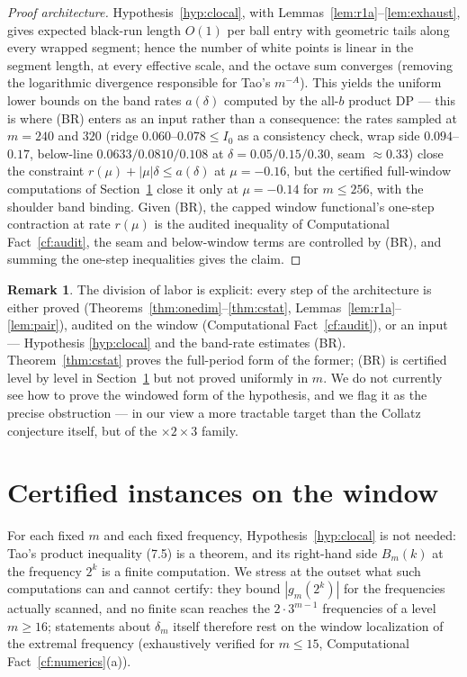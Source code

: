 \documentclass[11pt]{article}
\theoremstyle{definition}
\newtheorem{remark}[theorem]{Remark}
\begin{document}
\begin{proof}[Proof architecture]
Hypothesis~\ref{hyp:clocal}, with Lemmas~\ref{lem:r1a}--\ref{lem:exhaust},
gives expected black-run length $O(1)$ per ball entry with geometric
tails along every wrapped segment; hence the number of white points is
linear in the segment length, at every effective scale, and the octave
sum converges (removing the logarithmic divergence responsible for
Tao's $m^{-A}$). This yields the uniform lower bounds on the band rates
$a(\delta)$ computed by the all-$b$ product DP --- this is where (BR)
enters as an input rather than a consequence: the rates sampled at
$m=240$ and $320$ (ridge $0.060$--$0.078\le I_0$ as a consistency check,
wrap side $0.094$--$0.17$, below-line $0.0633/0.0810/0.108$ at
$\delta=0.05/0.15/0.30$, seam $\approx 0.33$) close the constraint
$r(\mu)+|\mu|\delta\le a(\delta)$ at $\mu=-0.16$, but the certified
full-window computations of Section~\ref{sec:instances} close it only at
$\mu=-0.14$ for $m\le 256$, with the shoulder band binding. Given (BR),
the capped window functional's one-step contraction at rate $r(\mu)$ is
the audited inequality of Computational Fact~\ref{cf:audit}, the seam and
below-window terms are controlled by (BR), and summing the one-step
inequalities gives the claim.
\end{proof}

\begin{remark}
The division of labor is explicit: every step of the architecture is
either proved (Theorems~\ref{thm:onedim}--\ref{thm:cstat},
Lemmas~\ref{lem:r1a}--\ref{lem:pair}), audited on the window
(Computational Fact~\ref{cf:audit}), or an input --- Hypothesis
\ref{hyp:clocal} and the band-rate estimates (BR). Theorem~\ref{thm:cstat}
proves the full-period form of the former; (BR) is certified level by
level in Section~\ref{sec:instances} but not proved uniformly in $m$. We
do not currently see how to prove the windowed form of the hypothesis,
and we flag it as the precise obstruction --- in our view a more tractable
target than the Collatz conjecture itself, but of the $\times 2\times 3$
family.
\end{remark}

\section{Certified instances on the window}\label{sec:instances}

For each fixed $m$ and each fixed frequency, Hypothesis~\ref{hyp:clocal}
is not needed: Tao's product inequality (7.5) is a theorem, and its
right-hand side $B_m(k)$ at the frequency $2^k$ is a finite computation.
We stress at the outset what such computations can and cannot certify:
they bound $|g_m(2^k)|$ for the frequencies actually scanned, and no
finite scan reaches the $2\cdot 3^{m-1}$ frequencies of a level $m\ge
16$; statements about $\delta_m$ itself therefore rest on the window
localization of the extremal frequency (exhaustively verified for
$m\le 15$, Computational Fact~\ref{cf:numerics}(a)).
\end{document}

